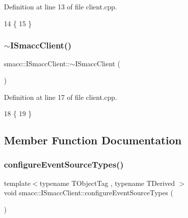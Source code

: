 Definition at line 13 of file client.\+cpp.


\begin{DoxyCode}
14 \{
15 \}
\end{DoxyCode}
\mbox{\label{classsmacc_1_1ISmaccClient_a030e17771bf2e404a6fad97273c4d7f4}} 
\subsubsection{\texorpdfstring{$\sim$\+I\+Smacc\+Client()}{~ISmaccClient()}}
{\footnotesize\ttfamily smacc\+::\+I\+Smacc\+Client\+::$\sim$\+I\+Smacc\+Client (\begin{DoxyParamCaption}{ }\end{DoxyParamCaption})\hspace{0.3cm}{\ttfamily [virtual]}}



Definition at line 17 of file client.\+cpp.


\begin{DoxyCode}
18 \{
19 \}
\end{DoxyCode}


\subsection{Member Function Documentation}
\mbox{\label{classsmacc_1_1ISmaccClient_a643285b93f2bd33987e0d0d1a12caf10}} 
\subsubsection{\texorpdfstring{configure\+Event\+Source\+Types()}{configureEventSourceTypes()}}
{\footnotesize\ttfamily template$<$typename T\+Object\+Tag , typename T\+Derived $>$ \\
void smacc\+::\+I\+Smacc\+Client\+::configure\+Event\+Source\+Types (\begin{DoxyParamCaption}{ }\end{DoxyParamCaption})\hspace{0.3cm}{\ttfamily [inline]}}



